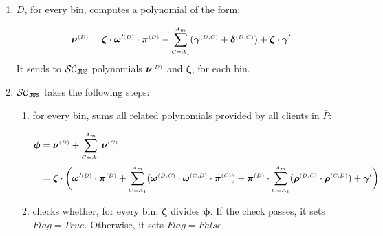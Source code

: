 \begin{enumerate}
\item\label{f-psi::D-gen-switching-poly}  $ {D}$,  for every bin, computes a polynomial of the form:  

$$\bm\nu^{\scriptscriptstyle  {  {(D)}}}=\bm\zeta \cdot  \bm\omega'^{\scriptscriptstyle  {  {(D)}}}\cdot \bm\pi^{\scriptscriptstyle  {  {(D)}} }-\sum\limits^{\scriptscriptstyle  {   A}_{\scriptscriptstyle  {   m}}}_{\scriptscriptstyle   {  {C }= }   {   A}_{\scriptscriptstyle  {  1}}}(\bm\gamma^{\scriptscriptstyle  {  {(D,C)}}} + \bm\delta^{\scriptscriptstyle  {  {(D,C)}}}) + \bm\zeta \cdot \bm\gamma'$$ 
It sends to $\mathcal{SC}_{\mathtt{JUS}}$  polynomials $\bm\nu^{\scriptscriptstyle  {  {(D)}}}$ and $\bm\zeta$, for each bin.

 \item\label{compute-res-poly}  $\mathcal{SC}_{\mathtt{JUS}}$ takes the following steps:
 \begin{enumerate}
 \item for every bin, sums all related polynomials  provided by all clients in $\bar{P}$:
 
 \begin{equation*}
\begin{split}
 \bm\phi&= \bm\nu^{\scriptscriptstyle  {  {(D)}} }+\sum\limits^{\scriptscriptstyle  {   A}_{\scriptscriptstyle  {   m}}}_{\scriptscriptstyle   {  {C }= }   {   A}_{\scriptscriptstyle  {  1}}}\bm\nu^{\scriptscriptstyle  {  {(C)}} }\\
 &= \bm\zeta\cdot \bigg(\bm\omega'^{\scriptscriptstyle  {  {(D)}}}\cdot \bm\pi^{\scriptscriptstyle  {  {(D)}} } +\sum\limits^{\scriptscriptstyle  {   A}_{  {   m}}}_{\scriptscriptstyle  {  {C }= }   {   A}_{\scriptscriptstyle  {  1}}}(\bm\omega^{\scriptscriptstyle  {  {(D,C)}}} \cdot \bm\omega^{\scriptscriptstyle  {  {(C,D)}}}\cdot \bm\pi^{\scriptscriptstyle  {  (C)}}) +\bm\pi^{\scriptscriptstyle  {  {(D)}}}\cdot\sum\limits^{\scriptscriptstyle  {   A}_{ \scriptscriptstyle {   m}}}_{\scriptscriptstyle  {C= }   {   A}_{\scriptscriptstyle  {  1}}}(\bm\rho^{\scriptscriptstyle  {  {(D,C)}}} \cdot \bm\rho^{\scriptscriptstyle  {  {(C,D)}}}) + \bm\gamma'\bigg)
  \end{split}
\end{equation*}
 
  \item\label{F-PSI:detect-misbehaving-party} checks whether, for every bin, $\bm\zeta$ divides $\bm\phi$. If the check passes, it sets $Flag=True$. Otherwise, it sets $Flag=False$. 
  
 
 
 \end{enumerate}
 

\end{enumerate}
